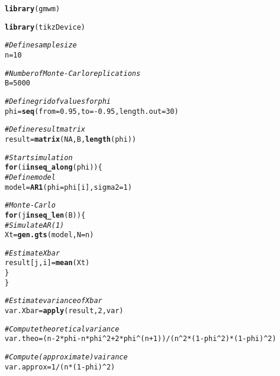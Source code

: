 \documentclass{article}\usepackage[]{graphicx}\usepackage[]{color}
\makeatletter
\newcommand{\hlnum}[1]{\textcolor[rgb]{0.686,0.059,0.569}{#1}}%
\newcommand{\hlcom}[1]{\textcolor[rgb]{0.678,0.584,0.686}{\textit{#1}}}%
\newcommand{\hlopt}[1]{\textcolor[rgb]{0,0,0}{#1}}%
\newcommand{\hlstd}[1]{\textcolor[rgb]{0.345,0.345,0.345}{#1}}%
\newcommand{\hlkwa}[1]{\textcolor[rgb]{0.161,0.373,0.58}{\textbf{#1}}}%
\newcommand{\hlkwb}[1]{\textcolor[rgb]{0.69,0.353,0.396}{#1}}%
\newcommand{\hlkwc}[1]{\textcolor[rgb]{0.333,0.667,0.333}{#1}}%
\newcommand{\hlkwd}[1]{\textcolor[rgb]{0.737,0.353,0.396}{\textbf{#1}}}%
\newenvironment{kframe}{%
 \def\at@end@of@kframe{}%
 \ifinner\ifhmode%
  \def\at@end@of@kframe{\end{minipage}}%
  \begin{minipage}{\columnwidth}%
 \fi\fi%
 \def\FrameCommand##1{\hskip\@totalleftmargin \hskip-\fboxsep
 \colorbox{shadecolor}{##1}\hskip-\fboxsep
     \hskip-\linewidth \hskip-\@totalleftmargin \hskip\columnwidth}%
 \MakeFramed {\advance\hsize-\width
   \@totalleftmargin\z@ \linewidth\hsize
   \@setminipage}}%
 {\par\unskip\endMakeFramed%
 \at@end@of@kframe}
\newenvironment{knitrout}{}{} %
\makeatother
\begin{document}
\begin{knitrout}
\color{fgcolor}\begin{kframe}
\begin{alltt}
\hlkwd{library}\hlstd{(gmwm)}
\end{alltt}


{\ttfamily\noindent\itshape\color{messagecolor}{\#\# Loading required package: ggplot2}}\begin{alltt}
\hlkwd{library}\hlstd{(tikzDevice)}

\hlcom{# Define sample size}
\hlstd{n} \hlkwb{=} \hlnum{10}

\hlcom{# Number of Monte-Carlo replications}
\hlstd{B} \hlkwb{=} \hlnum{5000}

\hlcom{# Define grid of values for phi}
\hlstd{phi} \hlkwb{=} \hlkwd{seq}\hlstd{(}\hlkwc{from} \hlstd{=} \hlnum{0.95}\hlstd{,} \hlkwc{to} \hlstd{=} \hlopt{-}\hlnum{0.95}\hlstd{,} \hlkwc{length.out} \hlstd{=} \hlnum{30}\hlstd{)}

\hlcom{# Define result matrix}
\hlstd{result} \hlkwb{=} \hlkwd{matrix}\hlstd{(}\hlnum{NA}\hlstd{,B,}\hlkwd{length}\hlstd{(phi))}

\hlcom{# Start simulation}
\hlkwa{for} \hlstd{(i} \hlkwa{in} \hlkwd{seq_along}\hlstd{(phi))\{}
  \hlcom{# Define model}
  \hlstd{model} \hlkwb{=} \hlkwd{AR1}\hlstd{(}\hlkwc{phi} \hlstd{= phi[i],} \hlkwc{sigma2} \hlstd{=} \hlnum{1}\hlstd{)}

  \hlcom{# Monte-Carlo}
  \hlkwa{for} \hlstd{(j} \hlkwa{in} \hlkwd{seq_len}\hlstd{(B))\{}
    \hlcom{# Simulate AR(1)}
    \hlstd{Xt} \hlkwb{=} \hlkwd{gen.gts}\hlstd{(model,} \hlkwc{N} \hlstd{= n)}

    \hlcom{# Estimate Xbar}
    \hlstd{result[j,i]} \hlkwb{=} \hlkwd{mean}\hlstd{(Xt)}
  \hlstd{\}}
\hlstd{\}}

\hlcom{# Estimate variance of Xbar}
\hlstd{var.Xbar} \hlkwb{=} \hlkwd{apply}\hlstd{(result,}\hlnum{2}\hlstd{,var)}

\hlcom{# Compute theoretical variance}
\hlstd{var.theo} \hlkwb{=} \hlstd{(n} \hlopt{-} \hlnum{2}\hlopt{*}\hlstd{phi} \hlopt{-} \hlstd{n}\hlopt{*}\hlstd{phi}\hlopt{^}\hlnum{2} \hlopt{+} \hlnum{2}\hlopt{*}\hlstd{phi}\hlopt{^}\hlstd{(n}\hlopt{+}\hlnum{1}\hlstd{))}\hlopt{/}\hlstd{(n}\hlopt{^}\hlnum{2}\hlopt{*}\hlstd{(}\hlnum{1}\hlopt{-}\hlstd{phi}\hlopt{^}\hlnum{2}\hlstd{)}\hlopt{*}\hlstd{(}\hlnum{1}\hlopt{-}\hlstd{phi)}\hlopt{^}\hlnum{2}\hlstd{)}

\hlcom{# Compute (approximate) vairance}
\hlstd{var.approx} \hlkwb{=} \hlnum{1}\hlopt{/}\hlstd{(n}\hlopt{*}\hlstd{(}\hlnum{1}\hlopt{-}\hlstd{phi)}\hlopt{^}\hlnum{2}\hlstd{)}


\end{alltt}
\end{kframe}
\end{knitrout}
\end{document}
